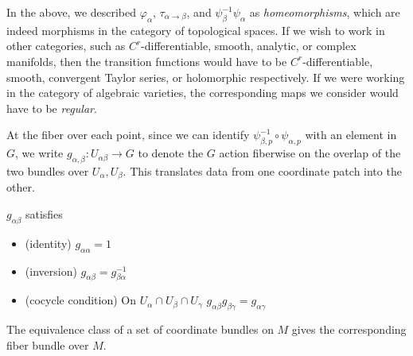 	\begin{nb}
		In the above, we described $\varphi_\alpha$, $\tau_{\alpha \to \beta}$, and $\psi_\beta^{-1} \psi_\alpha$ as \emph{homeomorphisms}, which are indeed morphisms in the category of topological spaces. If we wish to work in other categories, such as $C^r$-differentiable, smooth, analytic, or complex manifolds, then the transition functions would have to be $C^r$-differentiable, smooth, convergent Taylor series, or holomorphic respectively. 
		If we were working in the category of algebraic varieties, the corresponding maps we consider would have to be \emph{regular}.
	\end{nb}	
		
		At the fiber over each point, since we can identify $\psi^{-1}_{\beta, p} \circ \psi_{\alpha, p}$ with an element in $G$, we write $g_{\alpha, \beta}: U_{\alpha \beta} \rightarrow G$ to denote the $G$ action fiberwise on the overlap of the two bundles over $U_\alpha, U_\beta$. This translates data from one coordinate patch into the other.
		\begin{prop}
			$g_{\alpha \beta}$ satisfies 
			\begin{itemize}
				\item (identity) $g_{\alpha \alpha} = 1$
				\item (inversion) $g_{\alpha \beta} = g^{-1}_{\beta \alpha}$
				\item (cocycle condition) On $U_\alpha \cap U_\beta \cap U_\gamma$ $g_{\alpha \beta} g_{\beta \gamma} = g_{\alpha \gamma}$
			\end{itemize}
			\label{prop:cocycle}
		\end{prop}
%
%
%
		The equivalence class of a set of coordinate bundles on $M$ gives the corresponding fiber bundle over $M$.
		

